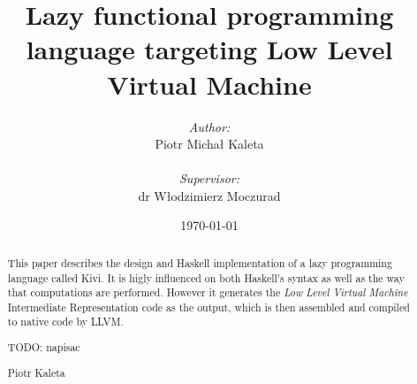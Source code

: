 \documentclass[a4paper]{report}
\begin{document}


\title{Lazy functional programming language targeting Low Level Virtual Machine}
\author{\textit{Author:}\\Piotr Micha\l{} Kaleta\\\\\emph{Supervisor:}\\dr W\l{}odzimierz Moczurad}
\date{\today}

\maketitle
{}

\newpage
\thispagestyle{empty}
\mbox{}

\Huge
\begin{abstract}
  \normalsize
  \center
  This paper describes the design and Haskell implementation of a lazy
  programming language called Kivi. It is higly influenced on both Haskell's
  syntax as well as the way that computations are performed. However it generates
  the \textit{Low Level Virtual Machine}\cite{website:llvm} Intermediate
  Representation code as the output, which is then assembled and compiled to
  native code by LLVM.
\end{abstract}


\renewcommand{\abstractname}{Acknowledgements}
\begin{abstract}
  \normalsize
  \center

  TODO: napisac

  \begin{flushright}
    Piotr Kaleta
  \end{flushright}
\end{abstract}
\end{document}
